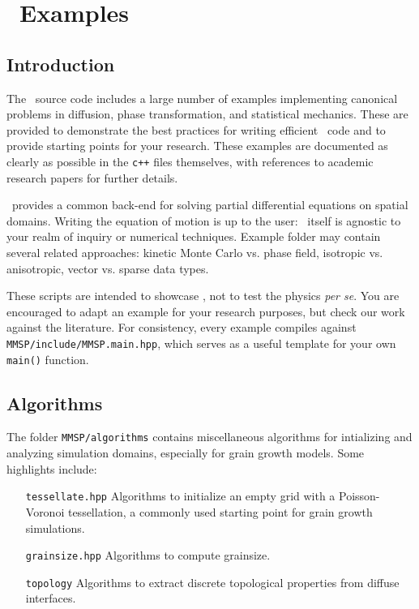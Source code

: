 
\chapter{\MMSP\ Examples}

\section{Introduction}
	The \MMSP\ source code includes a large number of examples implementing
	canonical problems in diffusion, phase transformation, and statistical
	mechanics. These are provided to demonstrate the best practices for
	writing efficient \MMSP\ code and to provide starting points for your
	research. These examples are documented as clearly as possible in the
	{\tt c++} files themselves, with references to academic research papers
	for further details.
	
	\MMSP\ provides a common back-end for solving partial differential equations
	on spatial domains. Writing the equation of motion is up to the user: \MMSP\ 
	itself is agnostic to your realm of inquiry or numerical techniques. Example
	folder may contain several related approaches: kinetic Monte Carlo vs. phase
	field, isotropic vs. anisotropic, vector vs. sparse data types.
	
	These scripts are intended to showcase \MMSP, not to test the physics \emph{per se}.
	You are encouraged to adapt an example for your research purposes, but
	check our work against the literature. For consistency, every example compiles
	against {\tt MMSP/include/MMSP.main.hpp}, which serves as a useful template for
	your own {\tt main()} function.
	

\section{Algorithms}
	The folder {\tt MMSP/algorithms} contains miscellaneous algorithms
	for intializing and analyzing simulation domains, especially for grain
	growth models. Some highlights include:
	\begin{itemize}
		\item[{\tt tessellate.hpp}] Algorithms to initialize an empty grid with
		a Poisson-Voronoi tessellation, a commonly used starting point for grain
		growth simulations.
		\item[{\tt grainsize.hpp}] Algorithms to compute grainsize.
		\item[{\tt topology}] Algorithms to extract discrete topological
		properties from diffuse interfaces.
	\end{itemize}
	

